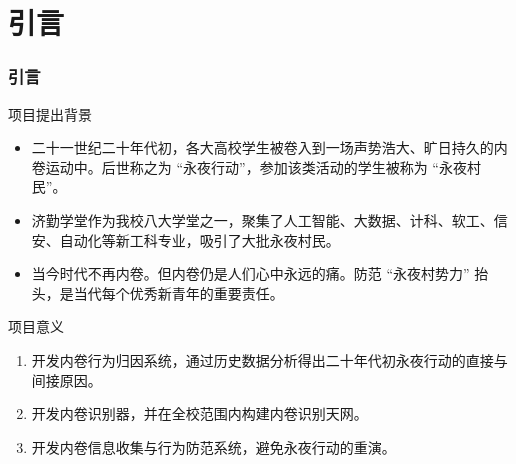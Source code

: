 %
%
%
%
\section{引言}
    \begin{frame}
    \frametitle{引言}
        \footnotesize
        \begin{block}{项目提出背景}
            \begin{itemize}
                \item 二十一世纪二十年代初，各大高校学生被卷入到一场声势浩大、旷日持久的内卷运动中。后世称之为 “永夜行动”，参加该类活动的学生被称为 “永夜村民”。
                \item 济勤学堂作为我校八大学堂之一，聚集了人工智能、大数据、计科、软工、信安、自动化等新工科专业，吸引了大批永夜村民。
                \item 当今时代不再内卷。但内卷仍是人们心中永远的痛。防范 “永夜村势力” 抬头，是当代每个优秀新青年的重要责任。
            \end{itemize}
        \end{block}

        \begin{block}{项目意义}
            \begin{enumerate}
                \item 开发内卷行为归因系统，通过历史数据分析得出二十年代初永夜行动的直接与间接原因。
                \item 开发内卷识别器，并在全校范围内构建内卷识别天网。
                \item 开发内卷信息收集与行为防范系统，避免永夜行动的重演。
            \end{enumerate}
        \end{block}
    \end{frame}

